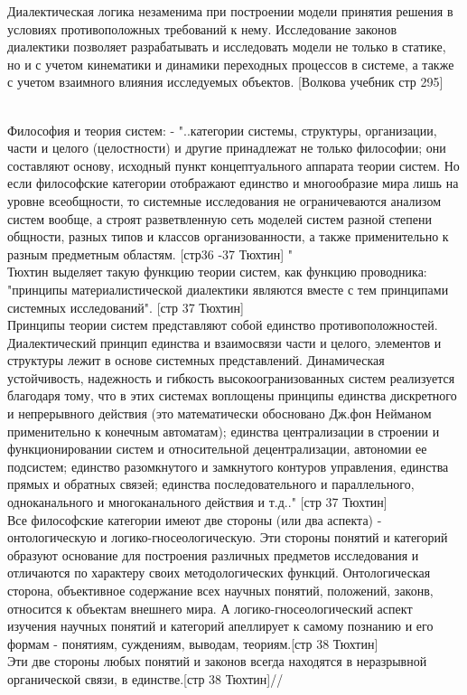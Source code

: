 \documentclass[a4paper,12pt]{report}
\begin{document}
	Диалектическая логика незаменима при построении модели принятия решения в условиях противоположных требований к нему.
	Исследование законов диалектики позволяет разрабатывать и исследовать модели не только в статике, но и с учетом кинематики и динамики переходных процессов в системе, а также с учетом взаимного влияния исследуемых объектов. [Волкова учебник стр 295]
	
\\Философия и теория систем: - "..категории системы, структуры, организации, части и целого (целостности) и другие принадлежат не только философии; они составляют основу, исходный пункт концептуального аппарата теории систем. Но если философские категории отображают единство и многообразие мира лишь на уровне всеобщности, то системные исследования не ограничеваются анализом систем вообще, а строят разветвленную сеть моделей систем разной степени общности, разных типов и классов организованности, а также применительно к разным предметным областям. [стр36 -37 Тюхтин] "\\
Тюхтин выделяет такую функцию теории систем, как функцию проводника: "принципы материалистической диалектики являются вместе с тем принципами системных исследований". [стр 37 Тюхтин]\\
Принципы теории систем представляют собой единство противоположностей. Диалектический принцип единства и взаимосвязи части и целого, элементов и структуры лежит в основе системных представлений. Динамическая устойчивость, надежность и гибкость высокоогранизованных систем реализуется благодаря тому, что в этих системах воплощены принципы единства дискретного и непрерывного действия (это математически обосновано Дж.фон Нейманом применительно к конечным автоматам); единства централизации в строении и функционировании систем и относительной децентрализации, автономии ее подсистем; единство разомкнутого и замкнутого контуров управления, единства прямых и обратных связей; единства последовательного и параллельного, одноканального и многоканального действия и т.д.." [стр 37 Тюхтин]\\
Все философские категории имеют две стороны (или два аспекта) - онтологическую и логико-гносеологическую. Эти стороны понятий и категорий образуют основание для построения различных предметов исследования и отличаются по характеру своих методологических функций. Онтологическая сторона, объективное содержание всех научных понятий, положений, законв, относится к объектам внешнего мира. А логико-гносеологический аспект изучения научных понятий и категорий апеллирует к самому познанию и его формам - понятиям, суждениям, выводам, теориям.[стр 38 Тюхтин]\\
Эти две стороны любых понятий и законов всегда находятся в неразрывной органической связи, в единстве.[стр 38 Тюхтин]// 
\end{document}
